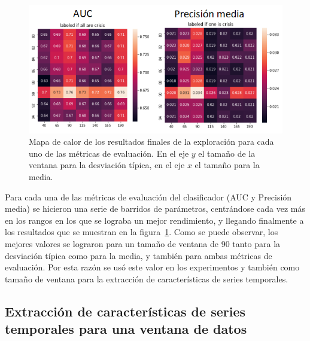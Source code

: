 \begin{figure}[H]
	\centering
	\includegraphics[width=1\textwidth]{../img/heatmap.png}
	\caption[Mapa de calor de los resultados finales de la exploración para cada uno de las métricas de evaluación.]{Mapa de calor de los resultados finales de la exploración para cada uno de las métricas de evaluación. En el eje $y$ el tamaño de la ventana para la desviación típica, en el eje $x$ el tamaño para la media.}
	\label{fig:heatmap}
\end{figure}

Para cada una de las métricas de evaluación del clasificador (AUC y Precisión media) se hicieron una serie de barridos de parámetros, centrándose cada vez más en los rangos en los que se lograba un mejor rendimiento, y llegando finalmente a los resultados que se muestran en la figura~\ref{fig:heatmap}. Como se puede observar, los mejores valores se lograron para un tamaño de ventana de 90 tanto para la desviación típica como para la media, y también para ambas métricas de evaluación. Por esta razón se usó este valor en los experimentos y también como tamaño de ventana para la extracción de características de series temporales. 

\subsection{Extracción de características de series temporales para una ventana de datos}

